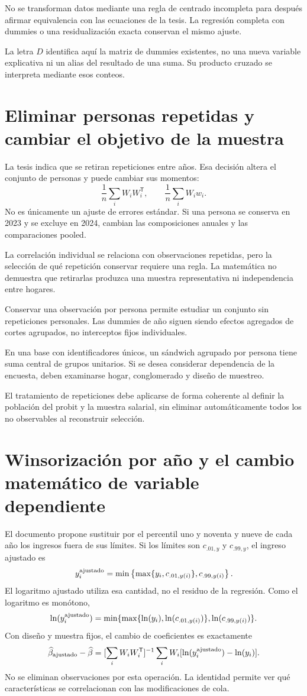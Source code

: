 \documentclass[11pt,a4paper]{article}
\begin{document}
No se transforman datos mediante una regla de centrado incompleta para después afirmar equivalencia con las ecuaciones de la tesis. La regresión completa con dummies o una residualización exacta conservan el mismo ajuste.

La letra $D$ identifica aquí la matriz de dummies existentes, no una nueva variable explicativa ni un alias del resultado de una suma. Su producto cruzado se interpreta mediante esos conteos.

\clearpage
\section{Eliminar personas repetidas y cambiar el objetivo de la muestra}

La tesis indica que se retiran repeticiones entre años. Esa decisión altera el conjunto de personas y puede cambiar sus momentos:
\[
\frac1n\sum_iW_iW_i^{\mathsf T},\qquad
\frac1n\sum_iW_iw_i.
\]
No es únicamente un ajuste de errores estándar. Si una persona se conserva en 2023 y se excluye en 2024, cambian las composiciones anuales y las comparaciones pooled.

La correlación individual se relaciona con observaciones repetidas, pero la selección de qué repetición conservar requiere una regla. La matemática no demuestra que retirarlas produzca una muestra representativa ni independencia entre hogares.

Conservar una observación por persona permite estudiar un conjunto sin repeticiones personales. Las dummies de año siguen siendo efectos agregados de cortes agrupados, no interceptos fijos individuales.

En una base con identificadores únicos, un sándwich agrupado por persona tiene suma central de grupos unitarios. Si se desea considerar dependencia de la encuesta, deben examinarse hogar, conglomerado y diseño de muestreo.

El tratamiento de repeticiones debe aplicarse de forma coherente al definir la población del probit y la muestra salarial, sin eliminar automáticamente todos los no observables al reconstruir selección.

\clearpage
\section{Winsorización por año y el cambio matemático de variable dependiente}

El documento propone sustituir por el percentil uno y noventa y nueve de cada año los ingresos fuera de sus límites. Si los límites son $c_{.01,y}$ y $c_{.99,y}$, el ingreso ajustado es
\[
y_i^{\rm ajustado}=
\min\left\{\max\{y_i,c_{.01,y(i)}\},c_{.99,y(i)}\right\}.
\]
El logaritmo ajustado utiliza esa cantidad, no el residuo de la regresión. Como el logaritmo es monótono,
\[
\ln(y_i^{\rm ajustado})
=\min\{\max\{\ln(y_i),\ln(c_{.01,y(i)})\},\ln(c_{.99,y(i)})\}.
\]
Con diseño y muestra fijos, el cambio de coeficientes es exactamente
\[
\widehat\beta_{\rm ajustado}-\widehat\beta
=[\sum_iW_iW_i^{\mathsf T}]^{-1}
\sum_iW_i[\ln(y_i^{\rm ajustado})-\ln(y_i)].
\]
No se eliminan observaciones por esta operación. La identidad permite ver qué características se correlacionan con las modificaciones de cola.
\end{document}
